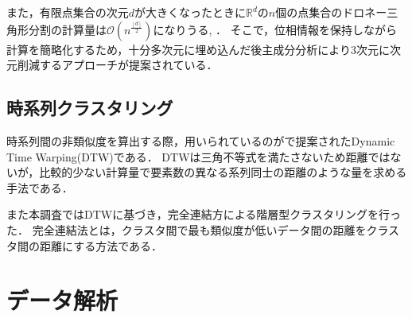 \documentclass{jarticle}
\begin{document}
また，有限点集合の次元$d$が大きくなったときに$\mathbb R^d$の$n$個の点集合のドロネー三角形分割の計算量は$\mathcal O(n^{\frac{[d]}{2}})$になりうる\cite{Amenta2007}, \cite{Attali2003}．
そこで，位相情報を保持しながら計算を簡略化するため，十分多次元に埋め込んだ後主成分分析により3次元に次元削減するアプローチが提案されている\cite{Truong2017}．


\subsection{時系列クラスタリング}
時系列間の非類似度を算出する際，用いられているのが\cite{Berndt1996}で提案されたDynamic Time Warping(DTW)である．
DTWは三角不等式を満たさないため距離ではないが，比較的少ない計算量で要素数の異なる系列同士の距離のような量を求める手法である．

また本調査ではDTWに基づき，完全連結方による階層型クラスタリングを行った．
完全連結法とは，クラスタ間で最も類似度が低いデータ間の距離をクラスタ間の距離にする方法である．







\section{データ解析}
\end{document}

